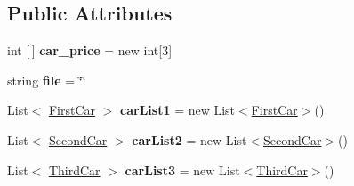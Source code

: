 \subsection*{Public Attributes}
\begin{DoxyCompactItemize}
\item 
\mbox{\label{class_project_app_1_1_cars_configs_a8a39985371d6bc5e6790af1e4215d226}} 
int \mbox{[}$\,$\mbox{]} {\bfseries car\+\_\+price} = new int\mbox{[}3\mbox{]}
\item 
\mbox{\label{class_project_app_1_1_cars_configs_a40929b1bed1fa97eb1b938ff382ab8d7}} 
string {\bfseries file} = \char`\"{}\char`\"{}
\item 
\mbox{\label{class_project_app_1_1_cars_configs_a439d5d47dbd9d127867e8e584d1b32a5}} 
List$<$ \mbox{\hyperlink{class_project_app_1_1_first_car}{First\+Car}} $>$ {\bfseries car\+List1} = new List$<$\mbox{\hyperlink{class_project_app_1_1_first_car}{First\+Car}}$>$()
\item 
\mbox{\label{class_project_app_1_1_cars_configs_a8ccaf6878bcf9e96991a4207370d4212}} 
List$<$ \mbox{\hyperlink{class_project_app_1_1_second_car}{Second\+Car}} $>$ {\bfseries car\+List2} = new List$<$\mbox{\hyperlink{class_project_app_1_1_second_car}{Second\+Car}}$>$()
\item 
\mbox{\label{class_project_app_1_1_cars_configs_a8815cb661b4ef9f56552a7ee73c1292a}} 
List$<$ \mbox{\hyperlink{class_project_app_1_1_third_car}{Third\+Car}} $>$ {\bfseries car\+List3} = new List$<$\mbox{\hyperlink{class_project_app_1_1_third_car}{Third\+Car}}$>$()
\end{DoxyCompactItemize}
